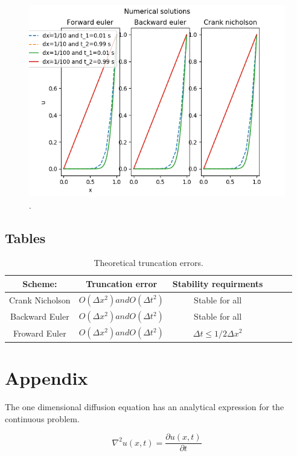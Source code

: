 \documentclass{article}
\begin{document}
\begin{figure}[H]
	\centering
	\includegraphics[width=120mm]{c.png}
	\caption{.}
	\label{fig:c}
\end{figure}

\subsection{Tables}


\begin{table}[H]
\begin{center}
\caption{Theoretical truncation errors.}
\begin{tabular}{  |c|c|c|c|c|c| } \hline
Scheme:&	Truncation error&Stability requirments \\ \hline
Crank Nicholson&$O(\Delta x^2) and O(\Delta t^2)$&Stable for all\\ \hline
Backward Euler&$O(\Delta x^2) and O(\Delta t^2)$&Stable for all\\ \hline
Froward Euler&$O(\Delta x^2) and O(\Delta t^2)$&$\Delta t \leq 1/2\Delta x^2$\\ \hline
\end{tabular}
\label{tab:a}
\end{center}
\end{table}

\section{Appendix}

The one dimensional diffusion equation has an analytical expression for the continuous problem. 

\begin{equation}
\nabla ^2 u(x,t)=\frac{\partial u(x,t)}{\partial t}
\label{eq:a1d}
\end{equation}
\end{document}
